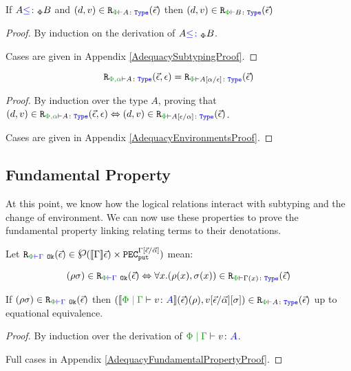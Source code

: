 \begin{framed}
    \begin{theorem}\label{LogRelSubtype}
        If $A{\color{blue} \leq\colon}_\Phi B$ and $\inLogRelPE{d}{v}{A}$ then $\inLogRelPE{d}{v}{B}$
    \end{theorem}
    
    \begin{proof}
        By induction on the derivation of $A{\color{blue} \leq\colon}_\Phi B$.
    
        Cases are given in Appendix \ref{AdequacySubtypingProof}.
    \end{proof}
\end{framed}

\begin{framed}
    \begin{lemma}[Environment z]\label{EnvironmentLemma}
        $$\erelates{\P,\a}{A}(\ev, \e) = \erelates{\P}{A\ssub{\e}{\a}}(\ev)$$
    \end{lemma}
    
    \begin{proof}
        By induction over the type $A$, proving that $\inLogRel{d}{v}{\P,\a}{A}{\ev, \e} \Leftrightarrow \inLogRelPE{d}{v}{A\ssub{\a}{\e}}$.
    
        Cases are given in Appendix \ref{AdequacyEnvironmentsProof}.
    \end{proof}
\end{framed}




\subsection{Fundamental Property}\label{FundProp}
At this point, we know how the logical relations interact with subtyping and the change of environment. We can now use these properties to prove the fundamental property linking relating terms to their denotations.

\begin{framed}
    \begin{theorem}\label{FundPropTheorem}
        Let $\erelatesg{\P}{\G}(\ev) \in \powset{\deno{\G}\ev)\times \pecput^{\G\ssub{\av}{\ev}}}$ mean:
    
        \begin{equation}
            \label{LogicalRelationTypeEnvironment}
            \inLogRelPEG{\rho}{\si}{\G} \Leftrightarrow \forall x. \inLogRelPE{\rho(x)}{\si(x)}{\G(x)}
        \end{equation}
    
    
        If $\inLogRelPEG{\rho}{\si}{\G}$ then $\inLogRelPE{\deno{\gpetyperelation{v}{A}}\fundRho}{v\fundSub}{A}$ up to equational equivalence.    
    \end{theorem}
    
    \begin{proof}
        By induction over the derivation of $\gpetyperelation{v}{A}$.
        
        Full cases in Appendix \ref{AdequacyFundamentalPropertyProof}.
    \end{proof}
\end{framed}


